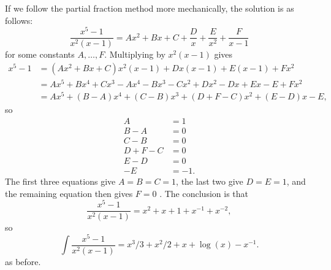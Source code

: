 \documentclass{amsart}
\renewcommand{\:}       {\colon}
\newcommand{\mks}[1]    {}
\newcommand{\mk}        {}
\begin{document}
\begin{enumerate}
  If we follow the partial fraction method more mechanically, the
  solution is as follows:
  \[ \frac{x^5-1}{x^2(x-1)} = 
      Ax^2 + Bx + C + \frac{D}{x} + \frac{E}{x^2} + \frac{F}{x-1}
      \mks{2}
  \]
  for some constants $A,\dotsc,F$.  Multiplying by $x^2(x-1)$ gives
  \begin{align*}
   x^5 - 1 &= 
    (Ax^2 + Bx + C)x^2(x-1) + Dx(x-1) + E(x-1) + Fx^2 \\
    &= Ax^5 + Bx^4 + Cx^3 - Ax^4 - Bx^3 - Cx^2 + Dx^2 - Dx + Ex - E + Fx^2 \\
    &= Ax^5 + (B-A)x^4 + (C-B)x^3 + (D+F-C)x^2 + (E-D)x - E, \mks{2}
  \end{align*}
  so 
  \begin{align*}
   A &= 1 \\
   B-A &= 0 \\
   C-B &= 0 \\
   D+F-C &= 0 \\
   E-D &= 0 \\
   -E &= -1 \mk.
  \end{align*}
  The first three equations give $A=B=C=1$, the last two give $D=E=1$,
  and the remaining equation then gives $F=0$ \mks{2}.  The conclusion is that 
  \[ \frac{x^5-1}{x^2(x-1)} = 
     x^2 + x + 1 + x^{-1} + x^{-2},
  \]
  so
  \[ \int \frac{x^5-1}{x^2(x-1)} =
      x^3/3 + x^2/2 + x + \log(x) - x^{-1} \mks{2}.
  \]
  as before.


\end{enumerate}
\end{document}
